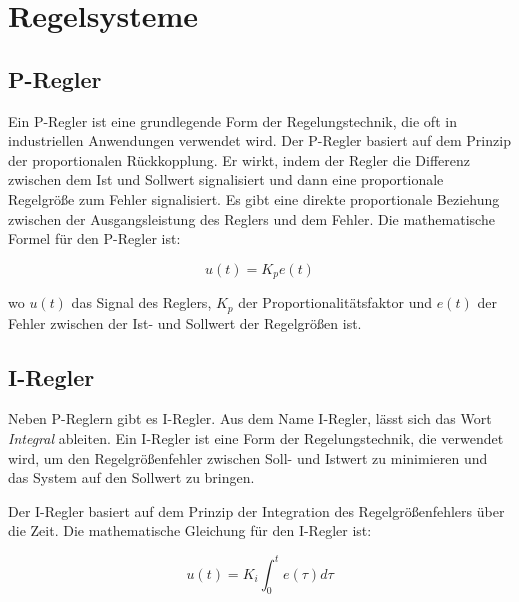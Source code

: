 \section{Regelsysteme} \label{regelsysteme:section}


    \subsection{P-Regler}
    \label{chp:p-regler}
    
    Ein \ac{P-Regler} ist eine grundlegende Form der Regelungstechnik, die oft in industriellen Anwendungen verwendet wird. Der \ac{P-Regler} basiert auf dem Prinzip der proportionalen Rückkopplung. Er wirkt, indem der Regler die Differenz zwischen dem Ist und Sollwert signalisiert und dann eine proportionale Regelgröße zum Fehler signalisiert.
    Es gibt eine direkte proportionale Beziehung zwischen der Ausgangsleistung des Reglers und dem Fehler. Die mathematische Formel für den P-Regler ist: 

    \begin{figure}[H]
    \begin{equation*}
        u(t) = K_p e(t)
    \end{equation*}

\end{figure}

    wo $u(t)$ das Signal des Reglers, $K_p$ der Proportionalitätsfaktor und $e(t)$ der Fehler zwischen der Ist- und Sollwert der Regelgrößen ist.

    \subsection{I-Regler}
\label{chp:i-regler}

    Neben \ac{P-Regler}n gibt es \ac{I-Regler}.
    Aus dem Name \ac{I-Regler}, lässt sich das Wort \textit{Integral} ableiten. Ein \ac{I-Regler} ist eine Form der Regelungstechnik, die verwendet wird, um den Regelgrößenfehler zwischen Soll- und Istwert zu minimieren und das System auf den Sollwert zu bringen. 

    Der I-Regler basiert auf dem Prinzip der Integration des Regelgrößenfehlers über die Zeit. Die mathematische Gleichung für den I-Regler ist:

    \begin{figure}[H]
        \begin{equation*}
            u(t) = K_i \int_{0}^{t} e(\tau) d\tau
        \end{equation*}
    \end{figure}

